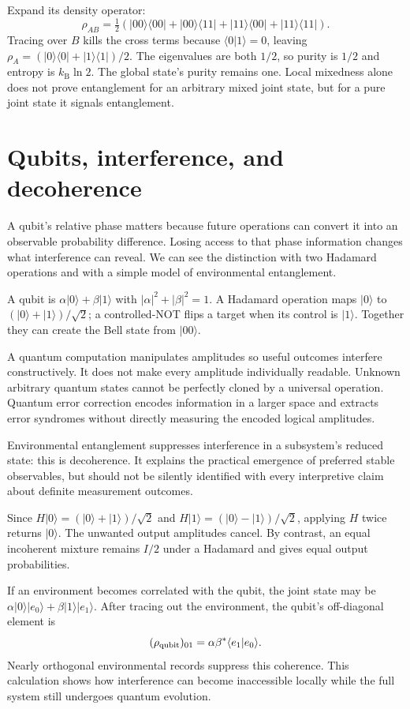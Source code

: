 \documentclass[11pt,oneside]{book}
\newcommand{\ket}[1]{\lvert #1\rangle}
\newcommand{\bra}[1]{\langle #1\rvert}
\newcommand{\kb}{k_{\mathrm B}}
\theoremstyle{reviewstyle}
\begin{document}
Expand its density operator:
\begin{equation}
\rho_{AB}=\tfrac12(\ket{00}\bra{00}+\ket{00}\bra{11}
+\ket{11}\bra{00}+\ket{11}\bra{11}).
\end{equation}
Tracing over $B$ kills the cross terms because $\langle0|1\rangle=0$, leaving $\rho_A=(\ket0\bra0+\ket1\bra1)/2$. The eigenvalues are both $1/2$, so purity is $1/2$ and entropy is $\kb\ln2$. The global state's purity remains one. Local mixedness alone does not prove entanglement for an arbitrary mixed joint state, but for a pure joint state it signals entanglement.

\section{Qubits, interference, and decoherence}
A qubit's relative phase matters because future operations can convert it into an observable probability difference. Losing access to that phase information changes what interference can reveal. We can see the distinction with two Hadamard operations and with a simple model of environmental entanglement.

A qubit is $\alpha\ket0+\beta\ket1$ with $|\alpha|^2+|\beta|^2=1$. A Hadamard operation maps $\ket0$ to $(\ket0+\ket1)/\sqrt2$; a controlled-NOT flips a target when its control is $\ket1$. Together they can create the Bell state from $\ket{00}$.

A quantum computation manipulates amplitudes so useful outcomes interfere constructively. It does not make every amplitude individually readable. Unknown arbitrary quantum states cannot be perfectly cloned by a universal operation. Quantum error correction encodes information in a larger space and extracts error syndromes without directly measuring the encoded logical amplitudes.

Environmental entanglement suppresses interference in a subsystem's reduced state: this is decoherence. It explains the practical emergence of preferred stable observables, but should not be silently identified with every interpretive claim about definite measurement outcomes.

Since $H\ket0=(\ket0+\ket1)/\sqrt2$ and $H\ket1=(\ket0-\ket1)/\sqrt2$, applying $H$ twice returns $\ket0$. The unwanted output amplitudes cancel. By contrast, an equal incoherent mixture remains $I/2$ under a Hadamard and gives equal output probabilities.

If an environment becomes correlated with the qubit, the joint state may be $\alpha\ket0\ket{e_0}+\beta\ket1\ket{e_1}$. After tracing out the environment, the qubit's off-diagonal element is
\begin{equation}
(\rho_{\rm qubit})_{01}=\alpha\beta^*\langle e_1|e_0\rangle.
\end{equation}
Nearly orthogonal environmental records suppress this coherence. This calculation shows how interference can become inaccessible locally while the full system still undergoes quantum evolution.
\end{document}
